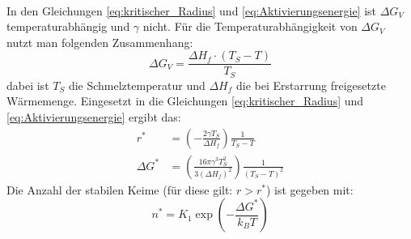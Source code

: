 \documentclass[11pt,a4paper]{article}
\numberwithin{equation}{section}
\numberwithin{figure}{section}
\begin{document}
\\
\begin{addmargin}[25pt]{0pt}
In den Gleichungen \ref{eq:kritischer_Radius} und \ref{eq:Aktivierungsenergie} ist $\Delta G_V$ temperaturabhängig und $\gamma$ nicht. Für die Temperaturabhängigkeit von $\Delta G_V$ nutzt man folgenden Zusammenhang:
\begin{equation}\label{eq:Umwandlungswärme}
    \Delta G_V = \frac{\Delta H_f \cdot (T_S - T)}{T_S}
\end{equation}
dabei ist $T_S$ die Schmelztemperatur und $\Delta H_f$ die bei Erstarrung freigesetzte Wärmemenge. Eingesetzt in die Gleichungen  \ref{eq:kritischer_Radius} und \ref{eq:Aktivierungsenergie} ergibt das:
\begin{align}
    r^* &= \left( - \frac{2\gamma T_S}{\Delta H_f}\right) \frac{1}{T_S - T}\\
    \Delta G^* &= \left( \frac{16\pi \gamma^3 T_S^2}{3(\Delta H_f)^2}\right) \frac{1}{(T_S - T)^2} 
\end{align}
Die Anzahl der stabilen Keime (für diese gilt: $r>r^*$) ist gegeben mit:
\begin{equation}
    n^* = K_1 \exp(-\frac{\Delta G^*}{k_BT})
\end{equation}
\end{addmargin}
\end{document}
